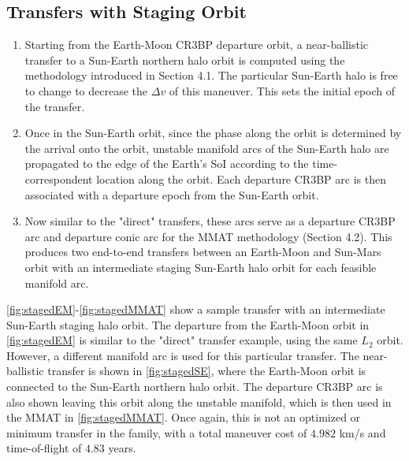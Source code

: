 \subsection{Transfers with Staging Orbit}
\begin{enumerate}
    \item   Starting from the Earth-Moon CR3BP departure orbit, a near-ballistic transfer to a
            Sun-Earth northern halo orbit is computed using the methodology introduced in Section
            4.1. The particular Sun-Earth halo is free to change to decrease the $\Delta v$ of this
            maneuver. This sets the initial epoch of the transfer.
    \item   Once in the Sun-Earth orbit, since the phase along the orbit is determined by the
            arrival onto the orbit, unstable manifold arcs of the Sun-Earth halo are propagated to
            the edge of the Earth's SoI according to the time-correspondent location along the
            orbit. Each departure CR3BP arc is then associated with a departure epoch from the
            Sun-Earth orbit.
    \item   Now similar to the "direct" transfers, these arcs serve as a departure CR3BP arc and
            departure conic arc for the MMAT methodology (Section 4.2). This produces two
            end-to-end transfers between an Earth-Moon and Sun-Mars orbit with an intermediate
            staging Sun-Earth halo orbit for each feasible manifold arc.
\end{enumerate}

\cref{fig:stagedEM}-\cref{fig:stagedMMAT} show a sample transfer with an intermediate Sun-Earth
staging halo orbit. The departure from the Earth-Moon orbit in \cref{fig:stagedEM} is similar to
the "direct" transfer example, using the same $L_{2}$ orbit. However, a different manifold arc is
used for this particular transfer. The near-ballistic transfer is shown in \cref{fig:stagedSE},
where the Earth-Moon orbit is connected to the Sun-Earth northern halo orbit. The departure CR3BP
arc is also shown leaving this orbit along the unstable manifold, which is then used in the MMAT in
\cref{fig:stagedMMAT}. Once again, this is not an optimized or minimum transfer in the family, with
a total maneuver cost of $4.982$ km/s and time-of-flight of $4.83$ years.

